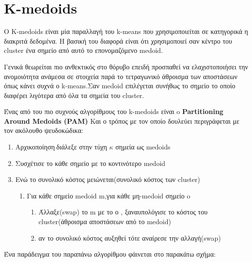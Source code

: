 \section{Κ-medoids}
Ο K-medoids είναι μία παραλλαγή του k-means που χρησιμοποιείται σε κατηγορικά η διακριτά δεδομένα. Η βασική του διαφορά είναι ότι  χρησιμοποιεί σαν κέντρο του cluster ένα σημείο από αυτό το επονομαζόμενο medoid.

Γενικά θεωρείται πιο ανθεκτικός στο θόρυβο επειδή προσπαθεί να ελαχιστοποιήσει την ανομοιότητα ανάμεσα σε στοιχεία παρά το τετραγωνικό άθροισμα των αποστάσεων όπως κάνει συχνά ο k-means.Σαν medoid επιλέγεται συνήθως το σημείο το οποίο διαφέρει λιγότερα από όλα τα σημεία του cluster.


Ένας από του πιο συχνούς αλγορίθμους του k-medoids είναι o\textbf{ Partitioning Around Medoids (PAM)} Και ο τρόπος με τον οποίο δουλεύει 
περιγράφεται με τον ακόλουθο ψευδοκώδικα:
\begin{enumerate}
  \item Αρχικοποίηση$\:$διάλεξε στην τύχη $\kappa$ σημεία ως medoids
  \item Συσχέτισε το κάθε σημείο με το κοντινότερο medoid
  \item Ενώ το συνολικό κόστος  μειώνεται(συνολικό κόστος των cluster)
  \begin{enumerate}
  	\item Για κάθε σημείο medoid m,για κάθε μη-medoid σημείο o
  	\begin{enumerate}
  		\item Άλλαξε(swap) το m με το ο , ξαναυπολόγισε το κόστος του cluster(άθροισμα αποστάσεων από το medoid) 
  		\item αν το συνολικό κόστος αυξηθεί τότε αναίρεσε την αλλαγή(swap) 
  	\end{enumerate}
  \end{enumerate}
\end{enumerate}


\begin{minipage}{\linewidth}%
Ένα παράδειγμα του παραπάνω αλγορίθμου φάινεται στο παρακάτω σχήμα:
	\label{fig:pam}%
\end{minipage}